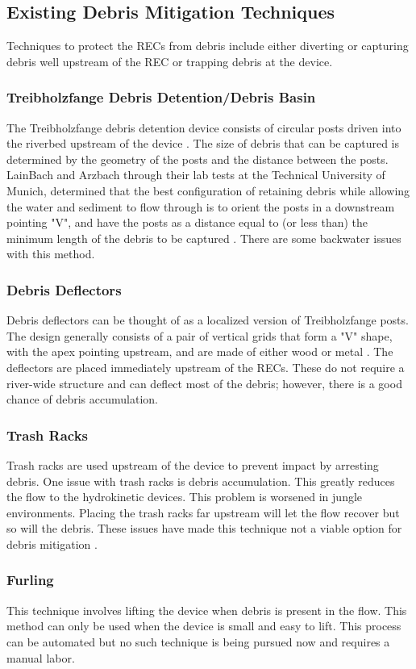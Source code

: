 \subsection{Existing Debris Mitigation Techniques}
Techniques to protect the RECs from debris include either diverting or capturing debris well upstream of the REC or trapping debris at the device.
\subsubsection{Treibholzfange Debris Detention/Debris Basin}
The Treibholzfange debris detention device consists of circular posts driven into the riverbed upstream of the device \citep{Reference1}. The size of debris that can be captured is determined by the geometry of the posts and the distance between the posts. LainBach and Arzbach through their lab tests at the Technical University of Munich, determined that the best configuration of retaining debris while allowing the water and sediment to flow through is to orient the posts in a downstream pointing "V", and have the posts as a distance equal to (or less than) the minimum length of the debris to be captured \citep{Reference4}. There are some backwater issues with this method. 
\subsubsection{Debris Deflectors}
Debris deflectors can be thought of as a localized version of Treibholzfange posts. The design generally consists of a pair of vertical grids that form a "V" shape, with the apex pointing upstream, and are made of either wood or metal \citep{Reference1}. The deflectors are placed immediately upstream of the RECs. These do not require a river-wide structure and can deflect most of the debris; however, there is a good chance of debris accumulation. 
\subsubsection{Trash Racks}
Trash racks are used upstream of the device to prevent impact by arresting debris. One issue with trash racks is debris accumulation. This greatly reduces the flow to the hydrokinetic devices. This problem is worsened in jungle environments. Placing the trash racks far upstream will let the flow recover but so will the debris. These issues have made this technique not a viable option for debris mitigation \citep{Reference1}. 
\subsubsection{Furling}
This technique involves lifting the device when debris is present in the flow. This method can only be used when the device is small and easy to lift. This process can be automated but no such technique is being pursued now and requires a manual labor.
